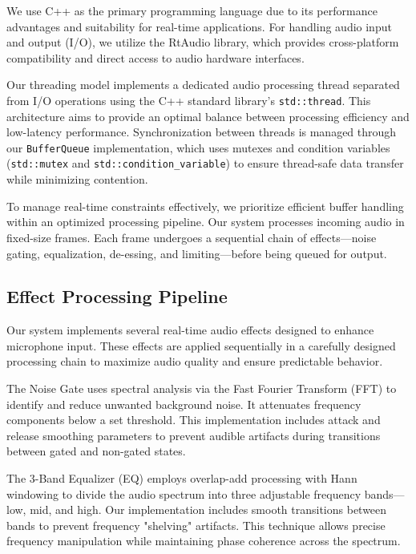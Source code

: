 \documentclass[conference]{IEEEtran}
\begin{document}
We use C++ as the primary programming language due to its performance advantages and suitability for real-time applications. For handling audio input and output (I/O), we utilize the RtAudio library, which provides cross-platform compatibility and direct access to audio hardware interfaces.

Our threading model implements a dedicated audio processing thread separated from I/O operations using the C++ standard library's \texttt{std::thread}. This architecture aims to provide an optimal balance between processing efficiency and low-latency performance. Synchronization between threads is managed through our \texttt{BufferQueue} implementation, which uses mutexes and condition variables (\texttt{std::mutex} and \texttt{std::condition\_variable}) to ensure thread-safe data transfer while minimizing contention.

To manage real-time constraints effectively, we prioritize efficient buffer handling within an optimized processing pipeline. Our system processes incoming audio in fixed-size frames. Each frame undergoes a sequential chain of effects—noise gating, equalization, de-essing, and limiting—before being queued for output.

\subsection*{Effect Processing Pipeline} 
Our system implements several real-time audio effects designed to enhance microphone input. These effects are applied sequentially in a carefully designed processing chain to maximize audio quality and ensure predictable behavior.

The Noise Gate uses spectral analysis via the Fast Fourier Transform (FFT) to identify and reduce unwanted background noise. It attenuates frequency components below a set threshold. This implementation includes attack and release smoothing parameters to prevent audible artifacts during transitions between gated and non-gated states.

The 3-Band Equalizer (EQ) employs overlap-add processing with Hann windowing to divide the audio spectrum into three adjustable frequency bands—low, mid, and high. Our implementation includes smooth transitions between bands to prevent frequency "shelving" artifacts. This technique allows precise frequency manipulation while maintaining phase coherence across the spectrum.
\end{document}
